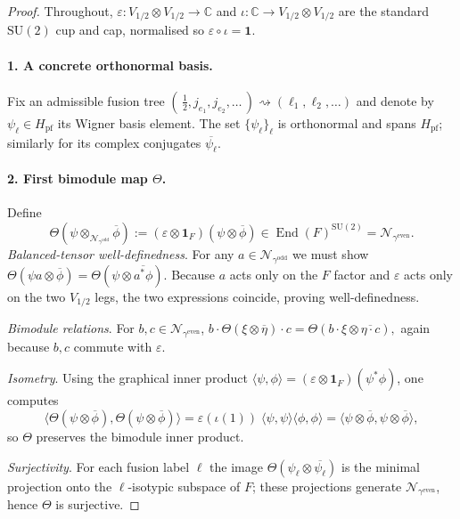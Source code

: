 \documentclass[11pt]{article}
\begin{document}
\begin{proof}
Throughout, $\varepsilon:V_{1/2}\!\otimes V_{1/2}\!\to\!\mathbb C$ and
$\iota:\mathbb C\!\to\!V_{1/2}\!\otimes V_{1/2}$ are the standard
$\mathrm{SU}(2)$ cup and cap, normalised so $\varepsilon\!\circ\!\iota=\mathbf1$.

\paragraph{1. A concrete orthonormal basis.}
Fix an admissible fusion tree
\(
  (\,\tfrac12,j_{e_1},j_{e_2},\dots\,)\rightsquigarrow
  (\ell_1,\ell_2,\dots)
\)
and denote by
$\psi_{\boldsymbol\ell}\in H_{\mathrm{pf}}$ its Wigner basis element.
The set
\(
   \{\psi_{\boldsymbol\ell}\}_{\boldsymbol\ell}
\)
is orthonormal and spans $H_{\mathrm{pf}}$; similarly for its complex
conjugates $\overline{\psi_{\boldsymbol\ell}}$.

\paragraph{2. First bimodule map $\Theta$.}
Define
\[
  \Theta(\psi\otimes_{\mathcal N_{\gamma^{\mathrm{odd}}}}\overline\phi)
  :=(\varepsilon\!\otimes\!\mathbf1_F)(\psi\otimes\overline\phi)
  \in\operatorname{End}(F)^{\mathrm{SU}(2)}
    =\mathcal N_{\gamma^{\mathrm{even}}}.
\]
\emph{Balanced-tensor well-definedness}.
For any $a\in\mathcal N_{\gamma^{\mathrm{odd}}}$
we must show
\(
   \Theta(\psi a\otimes\overline\phi)
   =\Theta(\psi\otimes\overline{a^{*}\phi}).
\)
Because $a$ acts only on the $F$ factor and $\varepsilon$ acts only on the
two $V_{1/2}$ legs, the two expressions coincide, proving
well-definedness.

\emph{Bimodule relations}.
For $b,c\in\mathcal N_{\gamma^{\mathrm{even}}}$,
\(
   b\cdot\Theta(\xi\otimes\overline\eta)\cdot c
   =\Theta(b\cdot\xi\otimes\overline{\eta\cdot c}),
\)
again because $b,c$ commute with $\varepsilon$.

\emph{Isometry}.
Using the graphical inner product
$\langle\psi,\phi\rangle
 =(\varepsilon\!\otimes\!\mathbf1_F)(\psi^{*}\phi)$,
one computes
\[
  \langle\Theta(\psi\otimes\overline\phi),
          \Theta(\psi\otimes\overline\phi)\rangle
  =\varepsilon(\iota(1))\;
   \langle\psi,\psi\rangle\langle\phi,\phi\rangle
  =\langle\psi\otimes\overline\phi,\psi\otimes\overline\phi\rangle,
\]
so $\Theta$ preserves the bimodule inner product.

\emph{Surjectivity}.
For each fusion label $\boldsymbol\ell$ the image
$\Theta(\psi_{\boldsymbol\ell}\otimes\overline{\psi_{\boldsymbol\ell}})$
is the minimal projection onto the $\boldsymbol\ell$-isotypic subspace of
$F$; these projections generate
$\mathcal N_{\gamma^{\mathrm{even}}}$, hence $\Theta$ is surjective.


\end{proof}
\end{document}
